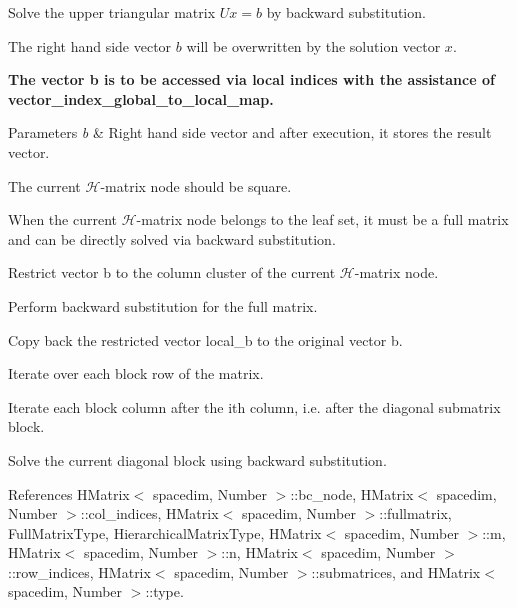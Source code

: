 Solve the upper triangular matrix $Ux=b$ by backward substitution.

The right hand side vector $b$ will be overwritten by the solution vector $x$.

{\bfseries The vector {\ttfamily b} is to be accessed via local indices with the assistance of {\ttfamily vector\+\_\+index\+\_\+global\+\_\+to\+\_\+local\+\_\+map}.}


\begin{DoxyParams}{Parameters}
{\em b} & Right hand side vector and after execution, it stores the result vector. \\
\hline
\end{DoxyParams}
The current $\mathcal{H}$-\/matrix node should be square.

When the current $\mathcal{H}$-\/matrix node belongs to the leaf set, it must be a full matrix and can be directly solved via backward substitution.

Restrict vector {\ttfamily b} to the column cluster of the current $\mathcal{H}$-\/matrix node.

Perform backward substitution for the full matrix.

Copy back the restricted vector {\ttfamily local\+\_\+b} to the original vector {\ttfamily b}.

Iterate over each block row of the matrix.

Iterate each block column after the i\textquotesingle{}th column, i.\+e. after the diagonal submatrix block.

Solve the current diagonal block using backward substitution.

References H\+Matrix$<$ spacedim, Number $>$\+::bc\+\_\+node, H\+Matrix$<$ spacedim, Number $>$\+::col\+\_\+indices, H\+Matrix$<$ spacedim, Number $>$\+::fullmatrix, Full\+Matrix\+Type, Hierarchical\+Matrix\+Type, H\+Matrix$<$ spacedim, Number $>$\+::m, H\+Matrix$<$ spacedim, Number $>$\+::n, H\+Matrix$<$ spacedim, Number $>$\+::row\+\_\+indices, H\+Matrix$<$ spacedim, Number $>$\+::submatrices, and H\+Matrix$<$ spacedim, Number $>$\+::type.

\mbox{\label{classHMatrix_aa90525e857add22b334bac84e6baacd2}} 
